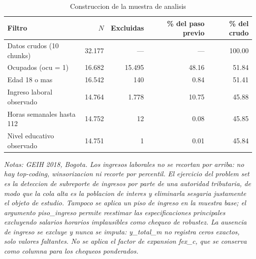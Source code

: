 \begin{table}[htbp]
\centering
\caption{Construccion de la muestra de analisis}
\label{tab:construccion-muestra}
\begin{tabular}{lrrrr}
\toprule
Filtro & $N$ & Excluidas & \% del paso previo & \% del crudo \\
\midrule
Datos crudos (10 chunks) & 32.177 & --- & --- & 100.00 \\
Ocupados (ocu = 1) & 16.682 & 15.495 & 48.16 & 51.84 \\
Edad 18 o mas & 16.542 & 140 & 0.84 & 51.41 \\
Ingreso laboral observado & 14.764 & 1.778 & 10.75 & 45.88 \\
Horas semanales hasta 112 & 14.752 & 12 & 0.08 & 45.85 \\
Nivel educativo observado & 14.751 & 1 & 0.01 & 45.84 \\
\bottomrule
\end{tabular}
\begin{minipage}{0.95\textwidth}
\footnotesize
\textit{Notas: GEIH 2018, Bogota. Los ingresos laborales no se recortan por arriba: no hay top-coding, winsorizacion ni recorte por percentil. El ejercicio del problem set es la deteccion de subreporte de ingresos por parte de una autoridad tributaria, de modo que la cola alta es la poblacion de interes y eliminarla sesgaria justamente el objeto de estudio. Tampoco se aplica un piso de ingreso en la muestra base; el argumento piso_ingreso permite reestimar las especificaciones principales excluyendo salarios horarios implausibles como chequeo de robustez. La ausencia de ingreso se excluye y nunca se imputa: y_total_m no registra ceros exactos, solo valores faltantes. No se aplica el factor de expansion fex_c, que se conserva como columna para los chequeos ponderados.}
\end{minipage}
\end{table}
